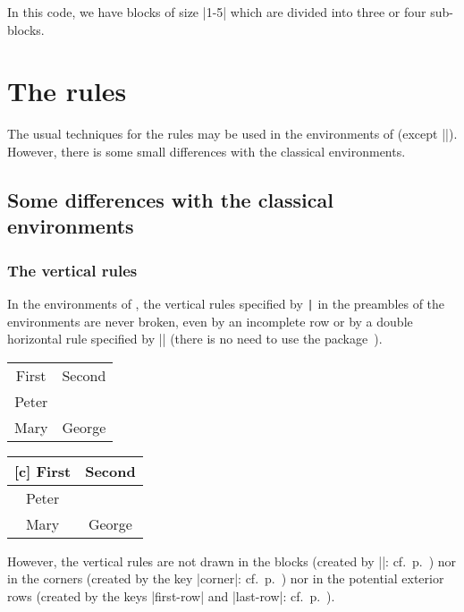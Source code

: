 \documentclass[dvipsnames]{article}%
\begin{document}
\medskip
In this code, we have blocks of size |1-5| which are divided into three or four
sub-blocks. 





\section{The rules}

\label{rules}

The usual techniques for the rules may be used in the environments of
 (except |\vline|). However, there is some small differences
with the classical environments.

\bigskip
\subsection{Some differences with the classical environments}

\subsubsection{The vertical rules}

In the environments of , the vertical rules specified by
\verb+|+ in the preambles of the environments are never broken, even by an
incomplete row or by a double horizontal rule specified by |\hline\hline|
(there is no need to use the package~).

\bigskip
\begin{Code}[width=10cm]
\begin{NiceTabular}{|c|c|} \hline
First & Second \\ \emph{\hline\hline}
Peter \\ \hline
Mary & George\\ \hline
\end{NiceTabular}
\end{Code}
\begin{NiceTabular}{|c|c|}[c] \hline
First & Second \\ \hline\hline
Peter \\ \hline
Mary  & George \\ \hline
\end{NiceTabular}


\bigskip
However, the vertical rules are not drawn in the blocks (created by |\Block|:
cf.~p.~\pageref{Block}) nor in the corners (created by the key |corner|:
cf.~p.~\pageref{corners}) nor in the potential exterior rows (created by the
keys |first-row| and |last-row|: cf.~p.~\pageref{exterior}).
\end{document}
